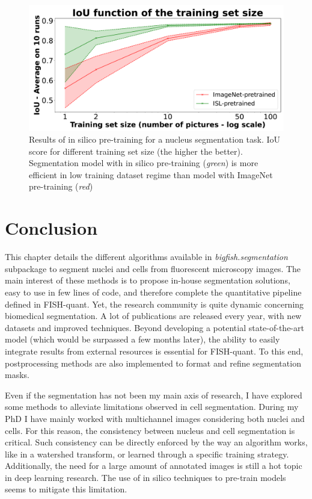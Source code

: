 \begin{figure}[]
    \centering
    \includegraphics[width=\textwidth]{figures/chapter3/insilico_training_size}
    \caption[Results of in silico pre-training]{Results of in silico pre-training for a nucleus segmentation task.
	IoU score for different training set size (the higher the better).
	Segmentation model with in silico pre-training (\textit{green}) is more efficient in low training dataset regime than model with ImageNet pre-training (\textit{red})}
    \label{fig:results_insilico}
\end{figure}

\section{Conclusion}
\label{sec:segmentation_conclusion}

This chapter details the different algorithms available in \emph{bigfish.segmentation} subpackage to segment nuclei and cells from fluorescent microscopy images.
The main interest of these methods is to propose in-house segmentation solutions, easy to use in few lines of code, and therefore complete the quantitative pipeline defined in FISH-quant.
Yet, the research community is quite dynamic concerning biomedical segmentation.
A lot of publications are released every year, with new datasets and improved techniques.
Beyond developing a potential state-of-the-art model (which would be surpassed a few months later), the ability to easily integrate results from external resources is essential for FISH-quant.
To this end, postprocessing methods are also implemented to format and refine segmentation masks.

Even if the segmentation has not been my main axis of research, I have explored some methods to alleviate limitations observed in cell segmentation.
During my PhD I have mainly worked with multichannel images considering both nuclei and cells.
For this reason, the consistency between nucleus and cell segmentation is critical.
Such consistency can be directly enforced by the way an algorithm works, like in a watershed transform, or learned through a specific training strategy.
Additionally, the need for a large amount of annotated images is still a hot topic in deep learning research.
The use of in silico techniques to pre-train models seems to mitigate this limitation.